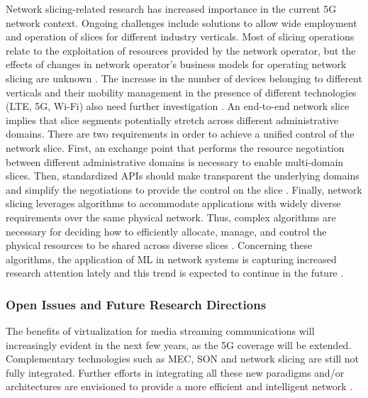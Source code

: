 Network slicing-related research has increased importance in the current 5G network context. %
Ongoing challenges %
include solutions to allow wide employment and operation of slices for different industry verticals. 
Most of slicing operations relate to the exploitation of resources provided by the network operator, but the effects of changes in network operator's business models for operating network slicing are unknown \cite{Barakabitze2019}.
The increase in the number of devices belonging to different verticals and their mobility management in the presence of different technologies (LTE, 5G, Wi-Fi) also need further investigation \cite{Zhang2017}.
An end-to-end network slice implies that slice segments potentially stretch across different administrative domains. There are two requirements in order to achieve a unified control of the network slice. First, an exchange point that performs the resource negotiation between different administrative domains is necessary to enable multi-domain slices. Then, standardized APIs should make transparent the underlying domains and simplify the negotiations to provide the control on the slice \cite{Afolabi2018}.
Finally, network slicing leverages algorithms to accommodate applications with widely diverse requirements over the same physical network. Thus, complex algorithms are necessary for deciding how to efficiently allocate, manage, and control the physical resources to be shared across diverse slices \cite{Vassilaras2017}. Concerning these algorithms, the application of ML in network systems is capturing increased research attention lately and this trend is expected to continue in the future \cite{Fadlullah2017}.

\subsubsection{Open Issues and Future Research Directions}

The benefits of virtualization for media streaming communications will increasingly evident in the next few years, as the 5G coverage will be extended. Complementary technologies such as MEC, SON and network slicing are still not fully integrated. Further efforts in integrating all these new paradigms and/or architectures are envisioned to provide a more efficient and intelligent network \cite{o-ran_integration}.

